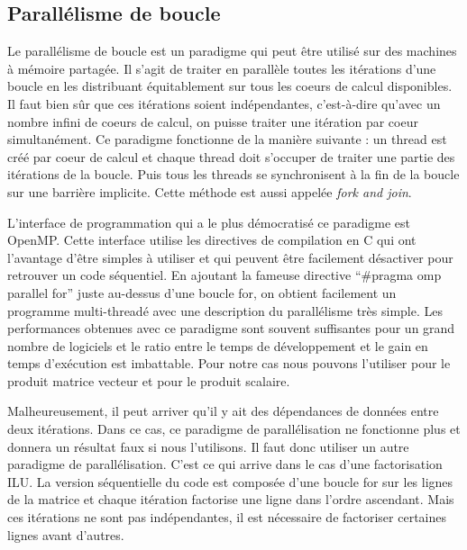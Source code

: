 \subsection{Parallélisme de boucle}
Le parallélisme de boucle est un paradigme qui peut être utilisé sur des machines à mémoire partagée.
%
Il s'agit de traiter en parallèle toutes les itérations d'une boucle en les distribuant équitablement sur tous les coeurs de calcul disponibles.
%
Il faut bien sûr que ces itérations soient indépendantes, c'est-à-dire qu'avec un nombre infini de coeurs de calcul, on puisse traiter une itération par coeur simultanément.
%
Ce paradigme fonctionne de la manière suivante : un thread est créé par coeur de calcul et chaque thread doit s'occuper de traiter une partie des itérations de la boucle.
%
Puis tous les threads se synchronisent à la fin de la boucle sur une barrière implicite.
%
Cette méthode est aussi appelée {\em fork and join}.

L'interface de programmation qui a le plus démocratisé ce paradigme est OpenMP.
%
Cette interface utilise les directives de compilation en C qui ont l'avantage d'être simples à utiliser et qui peuvent être facilement désactiver pour retrouver un code séquentiel.
%
En ajoutant la fameuse directive ``\#pragma omp parallel for'' juste au-dessus d'une boucle for, on obtient facilement un programme multi-threadé avec une description du parallélisme très simple.
%
Les performances obtenues avec ce paradigme sont souvent suffisantes pour un grand nombre de logiciels et le ratio entre le temps de développement et le gain en temps d'exécution est imbattable.
%
Pour notre cas nous pouvons l'utiliser pour le produit matrice vecteur et pour le produit scalaire.

Malheureusement, il peut arriver qu'il y ait des dépendances de données entre deux itérations.
%
Dans ce cas, ce paradigme de parallélisation ne fonctionne plus et donnera un résultat faux si nous l'utilisons.
%
Il faut donc utiliser un autre paradigme de parallélisation.
%
C'est ce qui arrive dans le cas d'une factorisation ILU.
%
La version séquentielle du code est composée d'une boucle for sur les lignes de la matrice et chaque itération factorise une ligne dans l'ordre ascendant.
%
Mais ces itérations ne sont pas indépendantes, il est nécessaire de factoriser certaines lignes avant d'autres.
